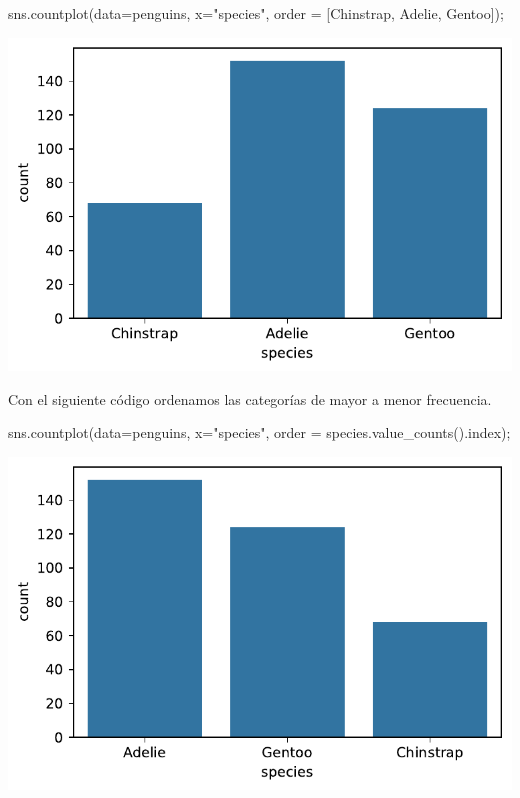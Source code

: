\documentclass[
  a4paper,
  noprof,
  12pt,
  notoc,
  nosols,
  nobib]{mnye}
\newenvironment{Shaded}{\begin{snugshade}}{\end{snugshade}}
\newcommand{\NormalTok}[1]{\textcolor[rgb]{0.00,0.23,0.31}{#1}}
\newcommand{\OperatorTok}[1]{\textcolor[rgb]{0.37,0.37,0.37}{#1}}
\newcommand{\StringTok}[1]{\textcolor[rgb]{0.13,0.47,0.30}{#1}}
\theoremstyle{definition}
\theoremstyle{remark}
\begin{document}
\begin{Shaded}
\begin{Highlighting}[]
\NormalTok{sns.countplot(data}\OperatorTok{=}\NormalTok{penguins, x}\OperatorTok{=}\StringTok{"species"}\NormalTok{, order }\OperatorTok{=}\NormalTok{ [}\StringTok{\textquotesingle{}Chinstrap\textquotesingle{}}\NormalTok{, }\StringTok{\textquotesingle{}Adelie\textquotesingle{}}\NormalTok{, }\StringTok{\textquotesingle{}Gentoo\textquotesingle{}}\NormalTok{])}\OperatorTok{;}
\end{Highlighting}
\end{Shaded}

\includegraphics{chapters/1categorical_files/figure-pdf/cell-13-output-1.pdf}

Con el siguiente código ordenamos las categorías de mayor a menor
frecuencia.

\begin{Shaded}
\begin{Highlighting}[]
\NormalTok{sns.countplot(data}\OperatorTok{=}\NormalTok{penguins, x}\OperatorTok{=}\StringTok{"species"}\NormalTok{, order }\OperatorTok{=}\NormalTok{ species.value\_counts().index)}\OperatorTok{;}
\end{Highlighting}
\end{Shaded}

\includegraphics{chapters/1categorical_files/figure-pdf/cell-14-output-1.pdf}
\end{document}
